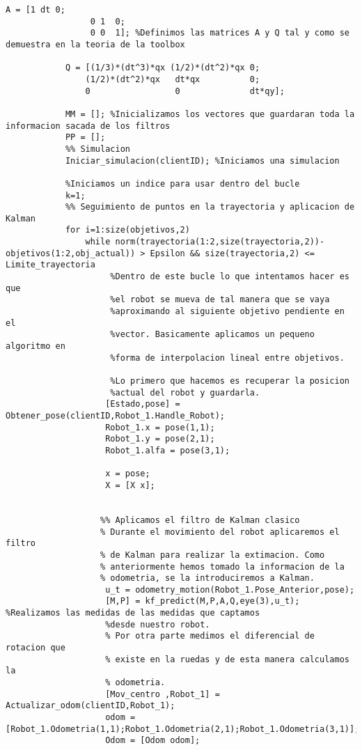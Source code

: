 \begin{lstlisting}[frame=single]
            A = [1 dt 0;
                 0 1  0;
                 0 0  1]; %Definimos las matrices A y Q tal y como se demuestra en la teoria de la toolbox

            Q = [(1/3)*(dt^3)*qx (1/2)*(dt^2)*qx 0;
                (1/2)*(dt^2)*qx   dt*qx          0;
                0                 0              dt*qy];

            MM = []; %Inicializamos los vectores que guardaran toda la informacion sacada de los filtros
            PP = [];
            %% Simulacion
            Iniciar_simulacion(clientID); %Iniciamos una simulacion 

            %Iniciamos un indice para usar dentro del bucle
            k=1;
            %% Seguimiento de puntos en la trayectoria y aplicacion de Kalman
            for i=1:size(objetivos,2)
                while norm(trayectoria(1:2,size(trayectoria,2))-objetivos(1:2,obj_actual)) > Epsilon && size(trayectoria,2) <= Limite_trayectoria
                     %Dentro de este bucle lo que intentamos hacer es que
                     %el robot se mueva de tal manera que se vaya
                     %aproximando al siguiente objetivo pendiente en el
                     %vector. Basicamente aplicamos un pequeno algoritmo en
                     %forma de interpolacion lineal entre objetivos.
                     
                     %Lo primero que hacemos es recuperar la posicion
                     %actual del robot y guardarla.
                    [Estado,pose] = Obtener_pose(clientID,Robot_1.Handle_Robot);
                    Robot_1.x = pose(1,1);
                    Robot_1.y = pose(2,1);
                    Robot_1.alfa = pose(3,1);
                   
                    x = pose;
                    X = [X x];
                    
                
                   %% Aplicamos el filtro de Kalman clasico
                   % Durante el movimiento del robot aplicaremos el filtro
                   % de Kalman para realizar la extimacion. Como
                   % anteriormente hemos tomado la informacion de la
                   % odometria, se la introduciremos a Kalman.
                    u_t = odometry_motion(Robot_1.Pose_Anterior,pose);
                    [M,P] = kf_predict(M,P,A,Q,eye(3),u_t);                    %Realizamos las medidas de las medidas que captamos
                    %desde nuestro robot.
                    % Por otra parte medimos el diferencial de rotacion que
                    % existe en la ruedas y de esta manera calculamos la
                    % odometria.
                    [Mov_centro ,Robot_1] = Actualizar_odom(clientID,Robot_1);
                    odom = [Robot_1.Odometria(1,1);Robot_1.Odometria(2,1);Robot_1.Odometria(3,1)];
                    Odom = [Odom odom];
                   

\end{lstlisting}
